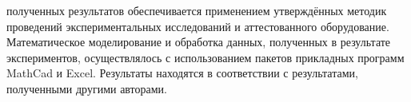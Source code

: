 



{\reliability} полученных результатов обеспечивается применением утверждённых методик проведений экспериментальных исследований и аттестованного оборудование. Математическое моделирование и обработка данных, полученных в результате экспериментов, осуществлялось с использованием пакетов прикладных программ MathCad и Excel. Результаты находятся в соответствии с результатами, полученными другими авторами.


